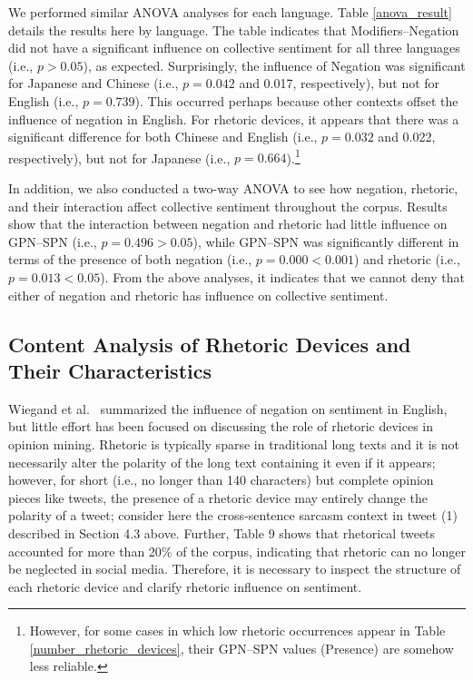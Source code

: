 \documentclass[english]{jnlp_1.4}
\begin{document}
\begin{table}[b]
\label{anova_result}

\end{table}

We performed similar ANOVA analyses for each language. Table \ref{anova_result} details the results here by language. The table indicates that Modifiers--Negation did not have a significant influence on collective sentiment for all three languages (i.e., $p > 0.05$), as expected. Surprisingly, the influence of Negation was significant for Japanese and Chinese (i.e., $p = 0.042$ and 0.017, respectively), but not for English (i.e., $p = 0.739$). This occurred perhaps because other contexts offset the influence of negation in English. For rhetoric devices, it appears that there was a significant difference for both Chinese and English (i.e., $p = 0.032$ and 0.022, respectively), but not for Japanese (i.e., $p = 0.664$).\footnote{However, for some cases in which low rhetoric occurrences appear in Table \ref{number_rhetoric_devices}, their GPN--SPN values (Presence) are somehow less reliable.}

In addition, we also conducted a two-way ANOVA to see how negation, rhetoric, and their interaction affect collective sentiment throughout the corpus. Results show that the interaction between negation and rhetoric had little influence on GPN--SPN (i.e., $p = 0.496 > 0.05$), while GPN--SPN was significantly different in terms of the presence of both negation (i.e., $p = 0.000 < 0.001$) and rhetoric (i.e., $p = 0.013 < 0.05$). From the above analyses, it indicates that we cannot deny that either of negation and rhetoric has influence on collective sentiment.


\subsection{Content Analysis of Rhetoric Devices and Their Characteristics}

Wiegand et al.\ \citeyear{Wiegand10} summarized the influence of negation on sentiment in English, but little effort has been focused on discussing the role of rhetoric devices in opinion mining. Rhetoric is typically sparse in traditional long texts and it is not necessarily alter the polarity of the long text containing it even if it appears; however, for short (i.e., no longer than 140 characters) but complete opinion pieces like tweets, the presence of a rhetoric device may entirely change the polarity of a tweet; consider here the cross-sentence sarcasm context in tweet (1) described in Section 4.3 above. Further, Table 9 shows that rhetorical tweets accounted for more than 20\% of the corpus, indicating that rhetoric can no longer be neglected in social media. Therefore, it is necessary to inspect the structure of each rhetoric device and clarify rhetoric influence on sentiment.
\end{document}
